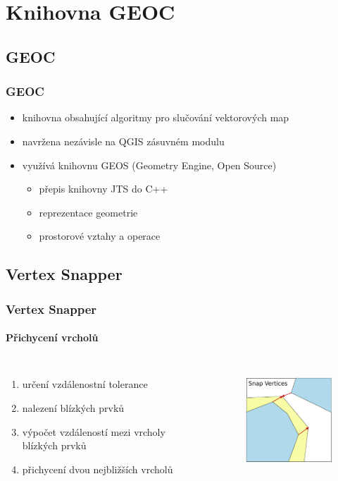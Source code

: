 \documentclass[unicode,bookmarksnumbered]{beamer}
\begin{document}
\section{Knihovna GEOC}   %

  \subsection{GEOC}
  \begin{frame}
  \frametitle{GEOC}
     \begin{itemize}
      \item knihovna obsahující algoritmy pro slučování vektorových map
      \item navržena nezávisle na QGIS zásuvném modulu 
      \item využívá knihovnu GEOS (Geometry Engine, Open Source)
      \begin{itemize}
       \item přepis knihovny JTS do C++
       \item reprezentace geometrie
       \item prostorové vztahy a operace
      \end{itemize}

     \end{itemize}
  \end{frame}

  \subsection{Vertex Snapper}  %
  \begin{frame}
  \frametitle{Vertex Snapper}
    \framesubtitle{Přichycení vrcholů}
    \begin{columns}[c]
	\column{2in}
	\begin{enumerate}
	   \item určení vzdálenostní tolerance
	   \item nalezení blízkých prvků
	   \item výpočet vzdáleností mezi vrcholy blízkých prvků
	   \item přichycení dvou nejbližších vrcholů
	\end{enumerate}
	\column{2in}
	  \begin{figure}
	  \centering
             \includegraphics[width=1.5in]{./pictures/snap.pdf}
	  \label{fig:vs-princip}
	  \end{figure}
      \end{columns}
  \end{frame}
\end{document}
